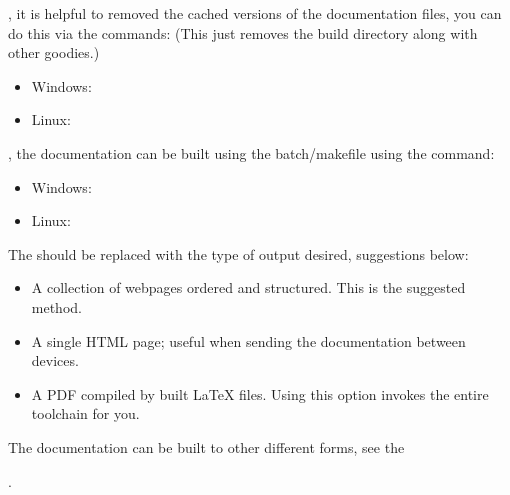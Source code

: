 \documentclass[letterpaper,11pt,english]{sphinxmanual}
\begin{document}
\sphinxAtStartPar
{}, it is helpful to removed the cached versions of the documentation
files, you can do this via the commands: (This just removes the build directory
along with other goodies.)
\begin{itemize}
\item {} 
\sphinxAtStartPar
Windows: 

\item {} 
\sphinxAtStartPar
Linux: 

\end{itemize}

\sphinxAtStartPar
{}, the documentation can be built using the batch/makefile using the
command:
\begin{itemize}
\item {} 
\sphinxAtStartPar
Windows: 

\item {} 
\sphinxAtStartPar
Linux: 

\end{itemize}

\sphinxAtStartPar
The  should be replaced with the type of output desired,
suggestions below:
\begin{itemize}
\item {} 
\sphinxAtStartPar
{} A collection of webpages ordered and structured. This is the suggested method.

\item {} 
\sphinxAtStartPar
{} A single HTML page; useful when sending the documentation between devices.

\item {} 
\sphinxAtStartPar
{} A PDF compiled by built LaTeX files. Using this option invokes the entire toolchain for you.

\end{itemize}

\sphinxAtStartPar
The documentation can be built to other different forms, see the
%
\begin{footnote}[30]\sphinxAtStartFootnote
{}
%
\end{footnote}.
\end{document}
